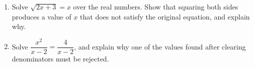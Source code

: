 \begin{enumerate}
\item[(a)] Solve $\sqrt{2x+3}=x$ over the real numbers. Show that squaring both sides produces a value of $x$ that does not satisfy the original equation, and explain why.
\item[(b)] Solve $\dfrac{x^2}{x-2}=\dfrac{4}{x-2}$, and explain why one of the values found after clearing denominators must be rejected.
\end{enumerate}
